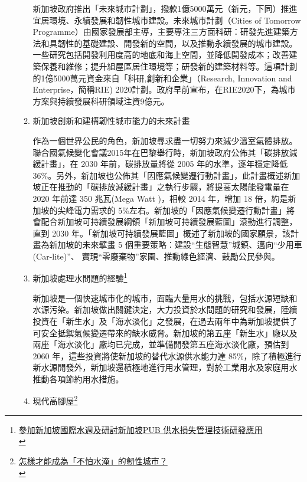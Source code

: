 \documentclass[a4paper,12pt]{article}
\begin{document}
\begin{enumerate}
\begin{enumerate}
新加坡政府推出「未來城市計劃」，撥款1億5000萬元（新元，下同）推進宜居環境、永續發展和韌性城市建設。未來城市計劃（Cities of Tomorrow Programme）由國家發展部主導，主要專注三方面科研：研發先進建築方法和具韌性的基礎建設、開發新的空間，以及推動永續發展的城市建設。\\

一些研究包括開發利用度高的地底和海上空間，並降低開發成本；改善建築保養和維修；提升組屋區居住環境等；研發新的建築材料等。這項計劃的1億5000萬元資金來自「科研,創新和企業」（Research, Innovation and Enterprise，簡稱RIE) 2020計劃。政府早前宣布，在RIE2020下，為城市方案與持續發展科研領域注資9億元。\\

\item 新加坡創新和建構韌性城市能力的未來計畫
\label{sec:org7e3860a}

作為一個世界公民的角色，新加坡尋求盡一切努力來減少溫室氣體排放。聯合國氣候變化會議2015年在巴黎舉行時，新加坡政府公佈其「碳排放減緩計畫」，在 2030 年前，碳排放量將從 2005 年的水準，逐年穩定降低 36\%。另外，新加坡也公佈其「因應氣候變遷行動計畫」，此計畫概述新加坡正在推動的「碳排放減緩計畫」之執行步驟，將提高太陽能發電量在 2020 年前達 350 兆瓦(Mega Watt )，相較 2014 年，增加 18 倍，約是新加坡的尖峰電力需求的 5\%左右。新加坡的「因應氣候變遷行動計畫」將會配合新加坡可持續發展綱領「新加坡可持續發展藍圖」滾動進行調整，直到 2030 年。「新加坡可持續發展藍圖」概述了新加坡的國家願景，該計畫為新加坡的未來擘畫 5 個重要策略：建設“生態智慧”城鎮、邁向“少用車(Car-lite)”、 實現“零廢棄物”家園、推動綠色經濟、鼓勵公民參與。\\

\item 新加坡處理水問題的經驗\footnote{\href{https://report.nat.gov.tw/ReportFront/PageSystem/reportFileDownload/C10502349/001}{參加新加坡國際水週及研討新加坡PUB 供水損失管理技術研發應用}\\}
\label{sec:org7437c6f}

新加坡是一個快速城市化的城市，面臨大量用水的挑戰，包括水源短缺和水源污染。新加坡做出關鍵決定，大力投資於水問題的研究和發展，陸續投資在「新生水」及「海水淡化」之發展，在過去兩年中為新加坡提供了可安全抵禦氣候變遷帶來的缺水威脅。新加坡的第五座「新生水」廠以及兩座「海水淡化」廠均已完成，並準備開發第五座海水淡化廠，預估到 2060 年，這些投資將使新加坡的替代水源供水能力達 85\%，除了積極進行新水源開發外，新加坡還積極地進行用水管理，對於工業用水及家庭用水推動各項節約用水措施。\\

\item 現代高腳屋\footnote{\href{https://kungsdailylife.blogspot.com/2019/05/blog-post\_34.html}{怎樣才能成為「不怕水淹」的韌性城市？ }\\}
\label{sec:org04ee9b5}


\end{enumerate}
\end{enumerate}
\end{document}
